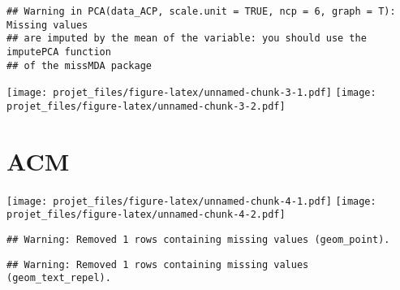 \documentclass[
]{article}
\newenvironment{Shaded}{\begin{snugshade}}{\end{snugshade}}
\newcommand{\ControlFlowTok}[1]{\textcolor[rgb]{0.13,0.29,0.53}{\textbf{#1}}}
\newcommand{\DataTypeTok}[1]{\textcolor[rgb]{0.13,0.29,0.53}{#1}}
\newcommand{\DecValTok}[1]{\textcolor[rgb]{0.00,0.00,0.81}{#1}}
\newcommand{\KeywordTok}[1]{\textcolor[rgb]{0.13,0.29,0.53}{\textbf{#1}}}
\newcommand{\NormalTok}[1]{#1}
\newcommand{\OperatorTok}[1]{\textcolor[rgb]{0.81,0.36,0.00}{\textbf{#1}}}
\newcommand{\OtherTok}[1]{\textcolor[rgb]{0.56,0.35,0.01}{#1}}
\newcommand{\StringTok}[1]{\textcolor[rgb]{0.31,0.60,0.02}{#1}}
\begin{document}
\begin{verbatim}
## Warning in PCA(data_ACP, scale.unit = TRUE, ncp = 6, graph = T): Missing values
## are imputed by the mean of the variable: you should use the imputePCA function
## of the missMDA package
\end{verbatim}

\texttt{[image: projet\_files/figure-latex/unnamed-chunk-3-1.pdf]}
\texttt{[image: projet\_files/figure-latex/unnamed-chunk-3-2.pdf]}

\hypertarget{acm}{%
\section{ACM}\label{acm}}

\begin{Shaded}
\end{Shaded}

\texttt{[image: projet\_files/figure-latex/unnamed-chunk-4-1.pdf]}
\texttt{[image: projet\_files/figure-latex/unnamed-chunk-4-2.pdf]}

\begin{verbatim}
## Warning: Removed 1 rows containing missing values (geom_point).
\end{verbatim}

\begin{verbatim}
## Warning: Removed 1 rows containing missing values (geom_text_repel).
\end{verbatim}
\end{document}
